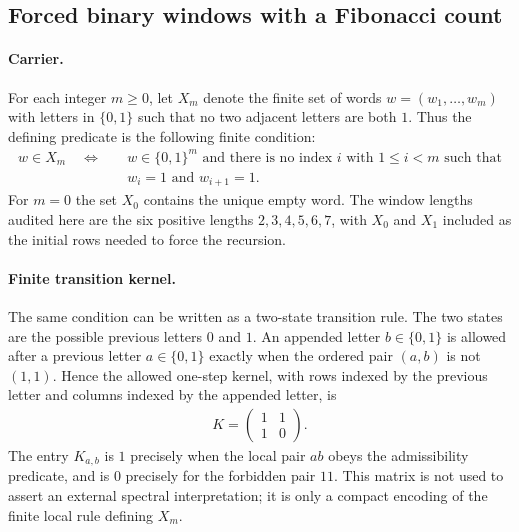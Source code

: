 
\subsection{Forced binary windows with a Fibonacci count}
\label{sec:f-a0-window6-fibonacci-sixframe-lock}

\paragraph{Carrier.}
For each integer $m\geq 0$, let $X_m$ denote the finite set of words $w=(w_1,\ldots,w_m)$ with letters in $\{0,1\}$ such that no two adjacent letters are both $1$. Thus the defining predicate is the following finite condition:
$$
\begin{aligned}
w\in X_m \quad \Longleftrightarrow \quad &w\in \{0,1\}^m\text{ and there is no index }i\text{ with }1\leq i<m\text{ such that}\\
&w_i=1\text{ and }w_{i+1}=1.
\end{aligned}
$$
For $m=0$ the set $X_0$ contains the unique empty word. The window lengths audited here are the six positive lengths $2,3,4,5,6,7$, with $X_0$ and $X_1$ included as the initial rows needed to force the recursion.

\paragraph{Finite transition kernel.}
The same condition can be written as a two-state transition rule. The two states are the possible previous letters $0$ and $1$. An appended letter $b\in\{0,1\}$ is allowed after a previous letter $a\in\{0,1\}$ exactly when the ordered pair $(a,b)$ is not $(1,1)$. Hence the allowed one-step kernel, with rows indexed by the previous letter and columns indexed by the appended letter, is
$$
\begin{aligned}
K=
\begin{pmatrix}
1&1\\
1&0
\end{pmatrix}.
\end{aligned}
$$
The entry $K_{a,b}$ is $1$ precisely when the local pair $ab$ obeys the admissibility predicate, and is $0$ precisely for the forbidden pair $11$. This matrix is not used to assert an external spectral interpretation; it is only a compact encoding of the finite local rule defining $X_m$.

